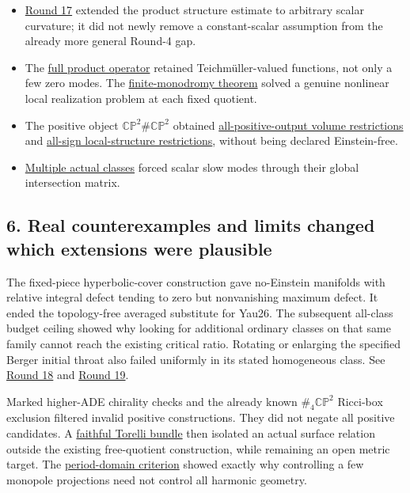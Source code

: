 \documentclass[
  10pt,
]{article}
\providecommand{\tightlist}{%
  \setlength{\itemsep}{0pt}\setlength{\parskip}{0pt}}
\begin{document}
\begin{itemize}
\tightlist
\item
  \href{../mathematics/current/round17_integral.md}{Round 17} extended
  the product structure estimate to arbitrary scalar curvature; it did
  not newly remove a constant-scalar assumption from the already more
  general Round-4 gap.
\item
  The \href{../mathematics/current/round17_product_operator.md}{full
  product operator} retained Teichmüller-valued functions, not only a
  few zero modes. The
  \href{../mathematics/current/round18_twisted_operator.md}{finite-monodromy
  theorem} solved a genuine nonlinear local realization problem at each
  fixed quotient.
\item
  The positive object \(\mathbb{CP}^2\#\mathbb{CP}^2\) obtained
  \href{../mathematics/current/round17_positive.md}{all-positive-output
  volume restrictions} and
  \href{../mathematics/current/round18_positive.md}{all-sign
  local-structure restrictions}, without being declared Einstein-free.
\item
  \href{../mathematics/current/round18_periods.md}{Multiple actual
  classes} forced scalar slow modes through their global intersection
  matrix.
\end{itemize}

\hypertarget{real-counterexamples-and-limits-changed-which-extensions-were-plausible}{%
\subsection{6. Real counterexamples and limits changed which extensions
were
plausible}\label{real-counterexamples-and-limits-changed-which-extensions-were-plausible}}

The fixed-piece hyperbolic-cover construction gave no-Einstein manifolds
with relative integral defect tending to zero but nonvanishing maximum
defect. It ended the topology-free averaged substitute for Yau26. The
subsequent all-class budget ceiling showed why looking for additional
ordinary classes on that same family cannot reach the existing critical
ratio. Rotating or enlarging the specified Berger initial throat also
failed uniformly in its stated homogeneous class. See
\href{../mathematics/current/round18_integral_limits.md}{Round 18} and
\href{../mathematics/current/round19.md}{Round 19}.

Marked higher-ADE chirality checks and the already known
\(\#_4\mathbb{CP}^2\) Ricci-box exclusion filtered invalid positive
constructions. They did not negate all positive candidates. A
\href{../mathematics/current/round20_construction.md}{faithful Torelli
bundle} then isolated an actual surface relation outside the existing
free-quotient construction, while remaining an open metric target. The
\href{../mathematics/current/round20_rigidity.md}{period-domain
criterion} showed exactly why controlling a few monopole projections
need not control all harmonic geometry.
\end{document}
